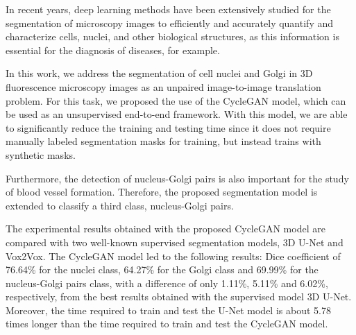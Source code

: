 \acresetall
\noindent In recent years, deep learning methods have been extensively studied for the segmentation of microscopy images to efficiently and accurately quantify and characterize cells, nuclei, and other biological structures, as this information is essential for the diagnosis of diseases, for example.

In this work, we address the segmentation of cell nuclei and Golgi in \ac{3D} fluorescence microscopy images as an unpaired image-to-image translation problem. For this task, we proposed the use of the CycleGAN model, which can be used as an unsupervised end-to-end framework. With this model, we are able to significantly reduce the training and testing time since it does not require manually labeled segmentation masks for training, but instead trains with synthetic masks.

Furthermore, the detection of nucleus-Golgi pairs is also important for the study of blood vessel formation. Therefore, the proposed segmentation model is extended to classify a third class, nucleus-Golgi pairs.

The experimental results obtained with the proposed CycleGAN model are compared with two well-known supervised segmentation models, \ac{3D} U-Net and Vox2Vox. The CycleGAN model led to the following results: Dice coefficient of 76.64\% for the nuclei class, 64.27\% for the Golgi class and 69.99\% for the nucleus-Golgi pairs class, with a difference of only 1.11\%, 5.11\% and 6.02\%, respectively, from the best results obtained with the supervised model \ac{3D} U-Net. Moreover, the time required to train and test the U-Net model is about 5.78 times longer than the time required to train and test the CycleGAN model.